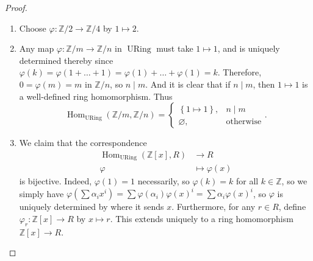 \documentclass[reqno]{amsart}
\theoremstyle{definition}
\theoremstyle{remark}
\DeclareMathOperator{\Hom}{Hom}
\DeclareMathOperator{\URing}{URing}
\begin{document}
    \begin{proof}
        \begin{enumerate}
            \item 
        Choose
        $\varphi  \colon \mathbb{Z}/2 \to \mathbb{Z}/4$ by
        $1 \mapsto 2$.
    \item Any map $ \varphi \colon 
        \mathbb{Z} /m \to \mathbb{Z} /n$ in
        $\URing$ must take $1 \mapsto 1$, and
        is uniquely determined thereby
        since $\varphi (k) =
        \varphi \left( 1 + \ldots+ 1 \right) 
        = \varphi (1) + \ldots + \varphi (1)
        = k$.
        Therefore, $0 = \varphi (m) = 
        m$ in $\mathbb{Z} / n$, so $n  \mid m$.
        And it is clear that if $n  \mid m$, then
        $1 \mapsto 1$ is a well-defined ring
        homomorphism. Thus
        \[
        \Hom_{\URing}\left( \mathbb{Z}/m,
        \mathbb{Z}/n \right) 
        = 
        \begin{cases}
            \left\{ 1 \mapsto 1 \right\},& n  \mid m\\
            \varnothing,& \text{otherwise}
        \end{cases}.
        \] 
    \item We claim that the correspondence
        \begin{align*}
            \Hom_{\URing}\left( \mathbb{Z}[x], R \right) 
            &\to R\\
            \varphi &\mapsto \varphi (x)
        \end{align*}
        is bijective.
        Indeed, $\varphi (1) = 1$ necessarily,
        so $\varphi (k) = k$ for
        all $k \in \mathbb{Z}$, so we
        simply have
        $\varphi \left( \sum \alpha_i x^{i} \right) 
        = \sum \varphi \left( \alpha_i \right) 
        \varphi (x)^{i} 
        = \sum \alpha_i \varphi (x)^{i}$, so
        $\varphi $ is uniquely determined by
        where it sends $x$. Furthermore,
        for any $r \in R$, define 
        $\varphi_r \colon
        \mathbb{Z}\left[ x \right] \to R$ by
        $x \mapsto r$. This extends uniquely to a
        ring homomorphism
        $\mathbb{Z}\left[ x \right] \to R$.
        









\end{enumerate}
\end{proof}
\end{document}
